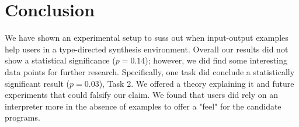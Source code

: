 \section{Conclusion}

We have shown an experimental setup to suss out when input-output examples help
users in a type-directed synthesis environment.
%
Overall our results did not show a statistical significance ($p = 0.14$);
however, we did find some interesting data points for further research.
%
Specifically, one task did conclude a statistically significant result ($p =
0.03$), Task 2.
%
We offered a theory explaining it and future experiments that could falsify our
claim.
%
We found that users did rely on an interpreter more in the absence of examples
to offer a "feel" for the candidate programs.